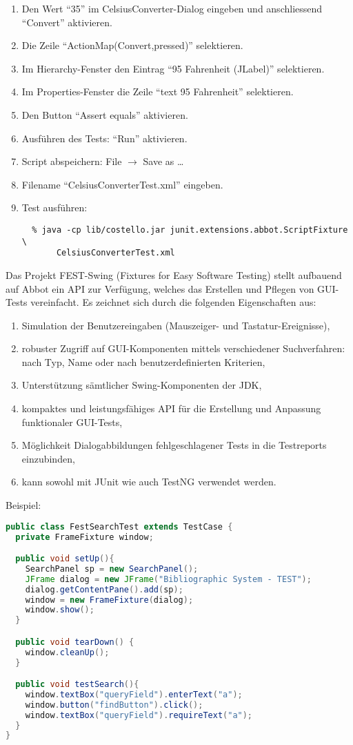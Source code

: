 \begin{enumerate}
\setcounter{enumi}{\value{saveenum}}
\item Den Wert ``35'' im CelsiusConverter-Dialog eingeben und anschliessend
  ``Convert'' aktivieren.
\item Die Zeile ``ActionMap(Convert,pressed)'' selektieren.
\item Im Hierarchy-Fenster den Eintrag ``95 Fahrenheit (JLabel)'' selektieren.
\item Im Properties-Fenster die Zeile ``text  95 Fahrenheit'' selektieren.
\item Den Button ``Assert equals'' aktivieren.
\item Ausführen des Tests: ``Run'' aktivieren.
\item Script abspeichern: File $\longrightarrow$ Save as \ldots
\item Filename ``CelsiusConverterTest.xml'' eingeben.
\item Test ausführen:
  \begin{lstlisting}
  % java -cp lib/costello.jar junit.extensions.abbot.ScriptFixture \
       CelsiusConverterTest.xml
  \end{lstlisting}
\end{enumerate}
%
Das Projekt
FEST-Swing
(Fixtures for Easy Software Testing) stellt aufbauend auf Abbot
ein API zur Verfügung, welches das Erstellen und Pflegen von GUI-Tests
vereinfacht. Es zeichnet sich durch die folgenden Eigenschaften aus:
\begin{enumerate}
  \item Simulation
  der Benutzereingaben (Mauszeiger- und Tastatur-Ereignisse),
  \item robuster Zugriff auf GUI-Komponenten mittels verschiedener
    Suchverfahren: nach Typ, Name oder nach benutzerdefinierten Kriterien,
  \item Unterstützung sämtlicher Swing-Komponenten der JDK,
  \item kompaktes und leistungsfähiges API für die Erstellung und
    Anpassung funktionaler GUI-Tests,
  \item Möglichkeit Dialogabbildungen fehlgeschlagener Tests in die
  Testreports einzubinden,
  \item kann sowohl mit JUnit wie auch TestNG verwendet werden.
  \end{enumerate}
Beispiel:
  \begin{lstlisting}[language=java]
public class FestSearchTest extends TestCase {
  private FrameFixture window;

  public void setUp(){
    SearchPanel sp = new SearchPanel();
    JFrame dialog = new JFrame("Bibliographic System - TEST");
    dialog.getContentPane().add(sp);
    window = new FrameFixture(dialog);
    window.show();
  }

  public void tearDown() {
    window.cleanUp();
  }

  public void testSearch(){
    window.textBox("queryField").enterText("a");
    window.button("findButton").click();
    window.textBox("queryField").requireText("a");
  }
}
\end{lstlisting}

